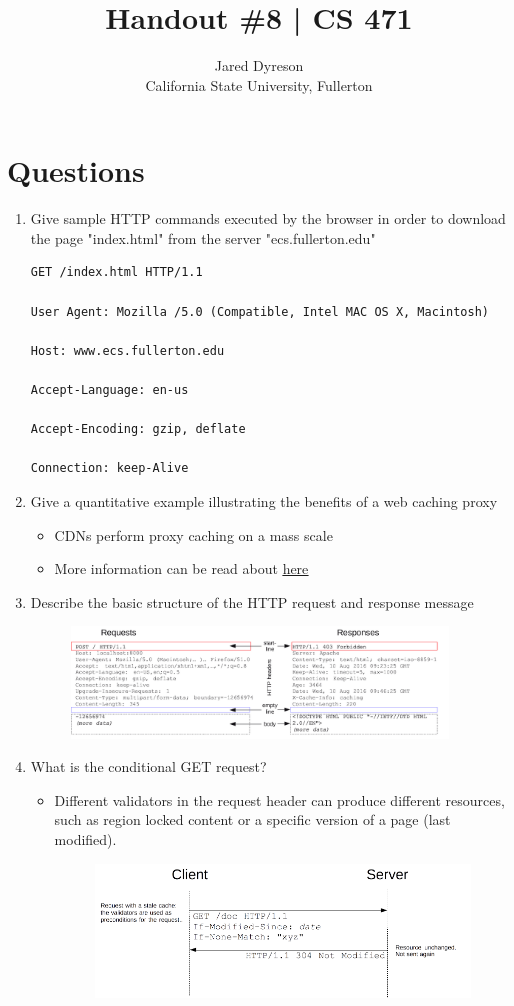 \documentclass{article}
\title{Handout \#8 | CS 471}
\author{Jared Dyreson\\ 
        California State University, Fullerton}
\begin{document}
\maketitle
\tableofcontents

\newpage

\section{Questions}

\begin{enumerate}
\item Give sample HTTP commands executed by the browser in order to download the page "index.html" from the server "ecs.fullerton.edu"
\begin{verbatim} 
GET /index.html HTTP/1.1

User Agent: Mozilla /5.0 (Compatible, Intel MAC OS X, Macintosh)

Host: www.ecs.fullerton.edu

Accept-Language: en-us

Accept-Encoding: gzip, deflate

Connection: keep-Alive
\end{verbatim}
\item Give a quantitative example illustrating the benefits of a web caching proxy
\begin{itemize}
\item CDNs perform proxy caching on a mass scale
\item More information can be read about \href{https://blog.stackpath.com/proxy-caching/}{\underline{here}}
\end{itemize}

\item Describe the basic structure of the HTTP request and response message
\begin{figure}[!h]
\centering
\includegraphics[width=10cm]{httpmsgstructure2}
\end{figure}
\item What is the conditional GET request?
\begin{itemize}
\item Different validators in the request header can produce different resources, such as region locked content or a specific version of a page (last modified).
\begin{figure}[!h]
\centering
\includegraphics[width=10cm]{httpcache2}
\end{figure}
\end{itemize}
\newpage


\end{enumerate}
\end{document}
